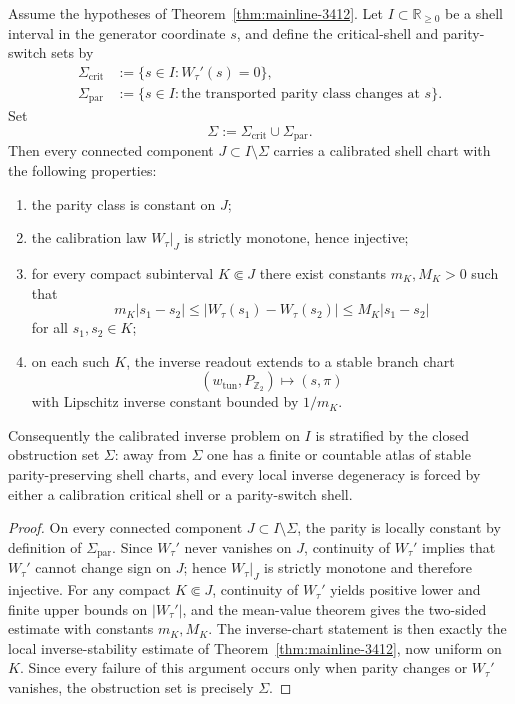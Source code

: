 \begin{theorem}
\label{thm:mainline-3413}
Assume the hypotheses of Theorem~\ref{thm:mainline-3412}. Let $I\subset \mathbb R_{\ge 0}$ be a shell interval in the generator coordinate $s$, and define the critical-shell and parity-switch sets by
\[
\begin{aligned}
\Sigma_{\mathrm{crit}}&:=\{s\in I: W_\tau'(s)=0\},\\
\Sigma_{\mathrm{par}}&:=\{s\in I:\text{the transported parity class changes at }s\}.
\end{aligned}
\]
Set
\[
  \Sigma:=\Sigma_{\mathrm{crit}}\cup\Sigma_{\mathrm{par}}.
\]
Then every connected component $J\subset I\setminus \Sigma$ carries a calibrated shell chart with the following properties:
\begin{enumerate}[label=(\roman*)]
  \item the parity class is constant on $J$;
  \item the calibration law $W_\tau|_J$ is strictly monotone, hence injective;
  \item for every compact subinterval $K\Subset J$ there exist constants $m_K,M_K>0$ such that
  \[
    m_K|s_1-s_2|
    \le |W_\tau(s_1)-W_\tau(s_2)|
    \le M_K|s_1-s_2|
  \]
  for all $s_1,s_2\in K$;
  \item on each such $K$, the inverse readout extends to a stable branch chart
  \[
    (w_{\mathrm{tun}},P_{\mathbb Z_2})
    \longmapsto
    (s,\pi)
  \]
  with Lipschitz inverse constant bounded by $1/m_K$.
\end{enumerate}
Consequently the calibrated inverse problem on $I$ is stratified by the closed obstruction set $\Sigma$: away from $\Sigma$ one has a finite or countable atlas of stable parity-preserving shell charts, and every local inverse degeneracy is forced by either a calibration critical shell or a parity-switch shell.
\end{theorem}

\begin{proof}
On every connected component $J\subset I\setminus \Sigma$, the parity is locally constant by definition of $\Sigma_{\mathrm{par}}$. Since $W_\tau'$ never vanishes on $J$, continuity of $W_\tau'$ implies that $W_\tau'$ cannot change sign on $J$; hence $W_\tau|_J$ is strictly monotone and therefore injective. For any compact $K\Subset J$, continuity of $W_\tau'$ yields positive lower and finite upper bounds on $|W_\tau'|$, and the mean-value theorem gives the two-sided estimate with constants $m_K,M_K$. The inverse-chart statement is then exactly the local inverse-stability estimate of Theorem~\ref{thm:mainline-3412}, now uniform on $K$. Since every failure of this argument occurs only when parity changes or $W_\tau'$ vanishes, the obstruction set is precisely $\Sigma$.
\end{proof}

